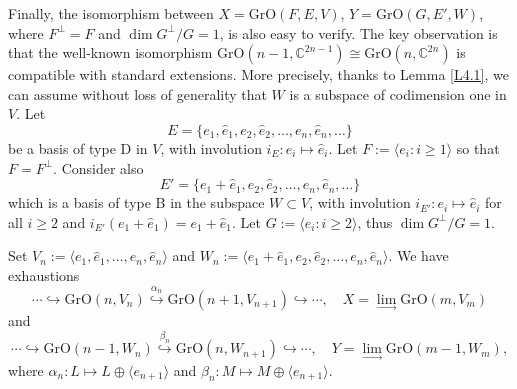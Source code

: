 \documentclass[12pt]{amsart}
\newcommand{\Grass}{\mathrm{Gr}}
\newcommand{\OGrass}{\mathrm{GrO}}
\newcommand{\SGrass}{\mathrm{GrS}}
\theoremstyle{definition}
\begin{document}

\medskip

Finally, the isomorphism between $X=\OGrass(F,E,V)$, $Y=\OGrass(G,E',W)$, where $F^\perp=F$ and $\dim G^\perp/G=1$, is also easy to verify. The key observation is that the well-known isomorphism $\OGrass(n-1,\mathbb{C}^{2n-1})\cong\OGrass(n,\mathbb{C}^{2n})$
is compatible with standard extensions. More precisely,
thanks to Lemma \ref{L4.1}, we can assume without loss of generality that $W$ is a subspace of codimension one in $V$. Let
$$
E=\{e_1,\hat{e}_1,e_2,\hat{e}_2,\ldots,e_n,\hat{e}_n,\ldots\}
$$
be a basis of type D in $V$, with involution $i_E:e_i\mapsto \hat{e}_i$.
Let 
$F:=\langle e_i:i\geq 1\rangle$ so that $F=F^\perp$.
Consider also
$$
E'=\{e_1+\hat{e}_1,e_2,\hat{e}_2,\ldots,e_n,\hat{e}_n,\ldots\}
$$
which is a basis of type B in the subspace $W\subset V$, with involution $i_{E'}:e_i\mapsto \hat{e}_i$ for all $i\geq 2$ and $i_{E'}(e_1+\hat{e}_1)=e_1+\hat{e}_1$. Let $G:=\langle e_i:i\geq 2\rangle$, thus $\dim G^\perp/G=1$.

Set $V_n:=\langle e_1,\hat{e}_1,\ldots,e_n,\hat{e}_n\rangle$
and $W_n:=\langle e_1+\hat{e}_1,e_2,\hat{e}_2,\ldots,e_n,\hat{e}_n\rangle$.
We have exhaustions
$$
\cdots\hookrightarrow
\OGrass(n,V_n)\stackrel{\alpha_n}{\hookrightarrow} \OGrass(n+1,V_{n+1})\hookrightarrow\cdots,\quad X=\lim_{\to}\OGrass(m,V_m)
$$
and
$$
\cdots\hookrightarrow
\OGrass(n-1,W_n)\stackrel{\beta_n}{\hookrightarrow} \OGrass(n,W_{n+1})\hookrightarrow\cdots,\quad Y=\lim_{\to}\OGrass(m-1,W_m),
$$
where $\alpha_n:L\mapsto L\oplus\langle e_{n+1}\rangle$
and $\beta_n:M\mapsto M\oplus\langle e_{n+1}\rangle$.
\end{document}
